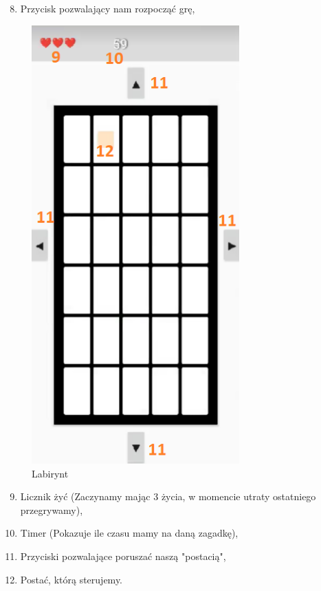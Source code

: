 \begin{enumerate}
	\setcounter{enumi}{7}
	\item Przycisk pozwalający nam rozpocząć grę,
\end{enumerate}

	\begin{figure}[!htb]
	\begin{center}
		\includegraphics[width=8cm]{rys/opis4.png}
		\caption{Labirynt}
		\label{rys:rysunek001}
	\end{center}
\end{figure}

\begin{enumerate}
	\setcounter{enumi}{8}
	\item Licznik żyć (Zaczynamy mając 3 życia, w momencie utraty ostatniego przegrywamy),
	\item Timer (Pokazuje ile czasu mamy na daną zagadkę),
	\item Przyciski pozwalające poruszać naszą "postacią",
	\item Postać, którą sterujemy.
\end{enumerate}

